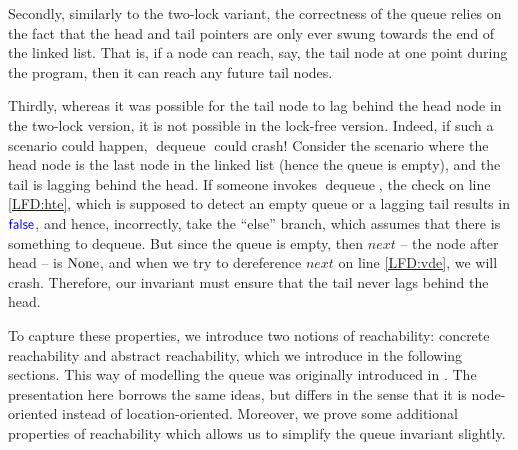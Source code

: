 \documentclass[a4paper, 10pt]{report}
\theoremstyle{definition}
\newcommand{\dequeue}{\operatorname{dequeue}}
\begin{document}
Secondly, similarly to the two-lock variant, the correctness of the queue relies on the fact that the head and tail pointers are only ever swung towards the end of the linked list. That is, if a node can reach, say, the tail node at one point during the program, then it can reach any future tail nodes.

Thirdly, whereas it was possible for the tail node to lag behind the head node in the two-lock version, it is not possible in the lock-free version. Indeed, if such a scenario could happen, $\dequeue$ could crash! Consider the scenario where the head node is the last node in the linked list (hence the queue is empty), and the tail is lagging behind the head. If someone invokes $\dequeue$, the check on line \ref{LFD:hte}, which is supposed to detect an empty queue or a lagging tail results in $\textsf{\color{blue} false}$, and hence, incorrectly, take the ``else'' branch, which assumes that there is something to dequeue. But since the queue is empty, then $next$ -- the node after head -- is $\operatorname{None}$, and when we try to dereference $next$ on line \ref{LFD:vde}, we will crash. Therefore, our invariant must ensure that the tail never lags behind the head.

To capture these properties, we introduce two notions of reachability: concrete reachability and abstract reachability, which we introduce in the following sections. This way of modelling the queue was originally introduced in \citet{DBLP:conf/cpp/VindumB21}. The presentation here borrows the same ideas, but differs in the sense that it is node-oriented instead of location-oriented. Moreover, we prove some additional properties of reachability which allows us to simplify the queue invariant slightly.
\end{document}
